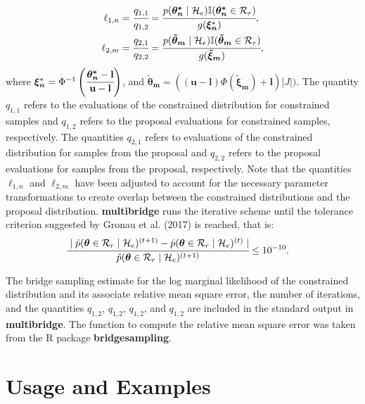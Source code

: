\documentclass[
  english,
  man,floatsintext]{apa6}
\begin{document}
\begin{align}
    \ell_{1,n} &= \cfrac{q_{1,1}}{q_{1,2}}  = \cfrac{p(\boldsymbol{\theta^*_n}\mid \mathcal{H}_e) \mathbb{I}(\boldsymbol{\theta^*_n}\in\mathcal{R}_r)}{g(\boldsymbol{\xi_n}^*)},\\
    \ell_{2,m} &= \cfrac{q_{2,1}}{q_{2,2}} = \cfrac{p(\boldsymbol{\tilde \theta_m}\mid \mathcal{H}_e) \mathbb{I}(\boldsymbol{\tilde \theta_m}\in\mathcal{R}_r)}{g(\boldsymbol{\tilde \xi_m})},
\end{align}
where \(\boldsymbol{\xi_n}^* = \Phi^{-1}\left(\cfrac{\boldsymbol{\theta^*_n} - \mathbf{l}}{\mathbf{u} - \mathbf{l}}\right)\), and \(\boldsymbol{\tilde \theta_m} = ((\mathbf{u} - \mathbf{l})\Phi(\boldsymbol{\tilde \xi_m}) + \mathbf{l}) \left|J\right|)\). The quantity \(q_{1,1}\) refers to the evaluations of the constrained distribution for constrained samples and \(q_{1,2}\) refers to the proposal evaluations for constrained samples, respectively. The quantities \(q_{2,1}\) refers to evaluations of the constrained distribution for samples from the proposal and \(q_{2,2}\) refers to the proposal evaluations for samples from the proposal, respectively. Note that the quantities \(\ell_{1,n}\) and \(\ell_{2,m}\) have been adjusted to account for the necessary parameter transformations to create overlap between the constrained distributions and the proposal distribution. \textbf{multibridge} runs the iterative scheme until the tolerance criterion suggested by Gronau et al. (2017) is reached, that is:
\begin{align*}
\cfrac{\mid \hat p(\boldsymbol{\theta} \in \mathcal{R}_r \mid \mathcal{H}_e)^{(t + 1)} - \hat p(\boldsymbol{\theta} \in \mathcal{R}_r \mid \mathcal{H}_e)^{(t)} \mid}{\hat p(\boldsymbol{\theta} \in \mathcal{R}_r \mid \mathcal{H}_e)^{(t + 1)}} &\leq 10^{-10}.
\end{align*}

The bridge sampling estimate for the log marginal likelihood of the constrained distribution and its associate relative mean square error, the number of iterations, and the quantities \(q_{1,2}\), \(q_{1,2}\), \(q_{1,2}\), and \(q_{1,2}\) are included in the standard output in \textbf{multibridge}. The function to compute the relative mean square error was taken from the R package \textbf{bridgesampling}.

\hypertarget{usage-and-examples}{%
\section{Usage and Examples}\label{usage-and-examples}}
\end{document}
